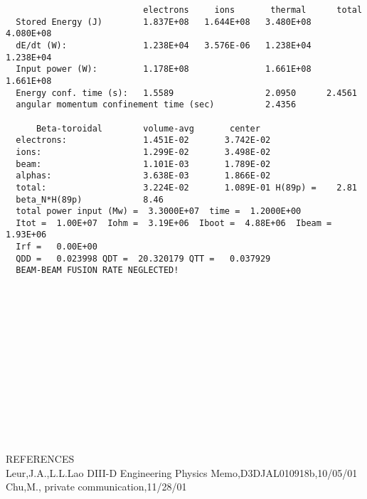 \begin{verbatim}
                           electrons     ions       thermal      total
  Stored Energy (J)        1.837E+08   1.644E+08   3.480E+08   4.080E+08
  dE/dt (W):               1.238E+04   3.576E-06   1.238E+04   1.238E+04
  Input power (W):         1.178E+08               1.661E+08   1.661E+08
  Energy conf. time (s):   1.5589                  2.0950      2.4561 
  angular momentum confinement time (sec)          2.4356
 
      Beta-toroidal        volume-avg       center
  electrons:               1.451E-02       3.742E-02
  ions:                    1.299E-02       3.498E-02
  beam:                    1.101E-03       1.789E-02
  alphas:                  3.638E-03       1.866E-02
  total:                   3.224E-02       1.089E-01 H(89p) =    2.81
  beta_N*H(89p)            8.46
  total power input (Mw) =  3.3000E+07  time =  1.2000E+00
  Itot =  1.00E+07  Iohm =  3.19E+06  Iboot =  4.88E+06  Ibeam =   1.93E+06 
  Irf =   0.00E+00
  QDD =   0.023998 QDT =  20.320179 QTT =   0.037929
  BEAM-BEAM FUSION RATE NEGLECTED!
  














 \end{verbatim}

  
\noindent  REFERENCES \\
 Leur,J.A.,L.L.Lao DIII-D Engineering Physics
 Memo,D3DJAL010918b,10/05/01  \\
  Chu,M., private communication,11/28/01


